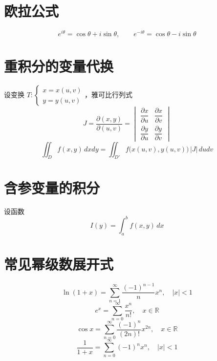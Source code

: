\section{欧拉公式}
\[
e^{i\theta}=\cos\theta+i\sin\theta,\qquad
e^{-i\theta}=\cos\theta-i\sin\theta
\]

\section{重积分的变量代换}
设变换 $T:\begin{cases}x=x(u,v)\\y=y(u,v)\end{cases}$，雅可比行列式
\[
J=\frac{\partial(x,y)}{\partial(u,v)}
=\begin{vmatrix}
\dfrac{\partial x}{\partial u} & \dfrac{\partial x}{\partial v}\\[4pt]
\dfrac{\partial y}{\partial u} & \dfrac{\partial y}{\partial v}
\end{vmatrix}
\]
\[
\iint_D f(x,y)\,dxdy
=\iint_{D'} f\big(x(u,v),y(u,v)\big)\,|J|\,dudv
\]

\section{含参变量的积分}
设函数
\[
I(y)=\int_a^b f(x,y)\,dx
\]

\section{常见幂级数展开式}
\[
\ln(1+x)=\sum_{n=1}^{\infty}\frac{(-1)^{n-1}}{n}x^n,\quad |x|<1
\]
\[
e^x=\sum_{n=0}^{\infty}\frac{x^n}{n!},\quad x\in\mathbb R
\]
\[
\cos x=\sum_{n=0}^{\infty}\frac{(-1)^n}{(2n)!}x^{2n},\quad x\in\mathbb R
\]
\[
\frac{1}{1+x}=\sum_{n=0}^{\infty} (-1)^n x^n,\quad |x|<1
\]